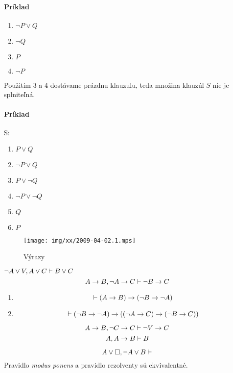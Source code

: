 \paragraph{Príklad} 
\begin{enumerate} 
	\item $ \neg P \lor Q $
	\item $ \neg Q $
	\item $ P $
	\item $ \neg P $
\end{enumerate}
Použitím 3 a 4 dostávame prázdnu klauzulu, teda množina klauzúl $S$ nie je
splniteľná.

\paragraph{Príklad}
S:
\begin{enumerate}
	\item $ P \lor Q $
	\item $ \neg P \lor Q $
	\item $ P \lor \neg Q $
	\item $ \neg P \lor \neg Q $
	\item $ Q $
	\item $ P $
\end{enumerate}

%
\begin{figure}[h]
	\centering\texttt{[image: img/xx/2009-04-02.1.mps]}
	\caption{Výrazy}
\end{figure}

$\neg A \lor V, A \lor C \vdash B \lor C$
$$A \rightarrow B, \neg A \rightarrow C \vdash \neg B \rightarrow C$$
\begin{enumerate}
	\item $$\vdash (A \rightarrow B) \rightarrow (\neg B \rightarrow \neg A)$$
	\item $$ \vdash (\neg B  \rightarrow \neg A) \rightarrow ((\neg A \rightarrow C)
	\rightarrow (\neg B \rightarrow C))$$
\end{enumerate}
$$ A \rightarrow B, \neg C \rightarrow C \vdash \neg V \rightarrow C$$
$$ A, A\rightarrow B \vdash B$$

$$A \lor \square, \neg A \lor B \vdash$$
Pravidlo \emph{modus ponens} a pravidlo rezolventy sú ekvivalentné.

